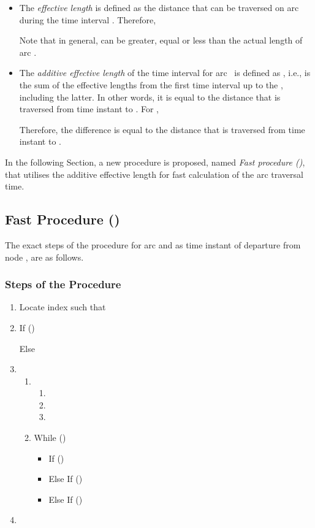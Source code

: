 \documentclass[conference]{IEEEtran}
\begin{document}
\begin{itemize}
    \item The \emph{effective length}  is defined as the distance that can be traversed on arc  during the time interval . Therefore, 
  
 

Note that in general,  can be greater, equal or less than the actual length  of arc .




    \item The \emph{additive effective length}  of the time interval  for arc~ is defined as , i.e., is the sum of the effective lengths from the first time interval  up to the , including the latter. In other words, it is equal to the distance that is traversed from time instant  to . For ,
    


Therefore, the difference  is equal to the distance that is traversed from time instant  to .  
\end{itemize}

  
In the following Section, a new procedure is proposed, named \emph{Fast  procedure ()}, that utilises the additive effective length for fast calculation of the arc traversal time. 

\subsection{Fast  Procedure ()} \label{fattc}

The exact steps of the  procedure for arc  and  as time instant of departure from node , are as follows.

\subsubsection{Steps of the  Procedure}

\begin{enumerate}
    \item Locate index  such that  \label{fattindex}
    \item If () 

    Else 
    \item
    \begin{enumerate}
        \item 
        \begin{enumerate}
            \item 
            \item 
            \item 
        \end{enumerate} 
        \item While ()   \label{fattwhile}
        \begin{itemize}
            \item If () 
            \item Else If () 
            \item Else If ()  
        \end{itemize}
    \end{enumerate}
    \item  
\end{enumerate}
\end{document}
